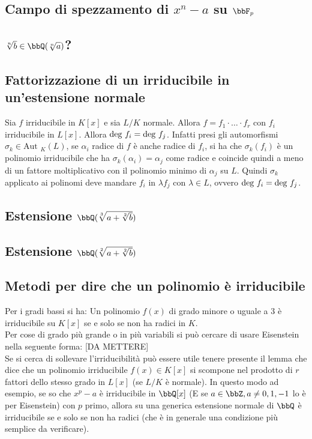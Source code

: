 \documentclass[a4paper,NoNotes,GeneralMath]{stdmdoc}
\newcommand{\Aut}{\text{Aut }}
\begin{document}
	\subsection{Campo di spezzamento di $x^n - a$ su $\bbF_p$}
	
	\subsection{$\sqrt[n]{b} \in \bbQ(\sqrt[n]{a})$?}
	
	\subsection{Fattorizzazione di un irriducibile in un'estensione normale}
	Sia $f$ irriducibile in $K[x]$ e sia $L/K$ normale. Allora $f = f_1 \cdot \ldots \cdot f_r$ con $f_i$ irriducibile in $L[x]$. Allora $\mbox{deg } f_i = \mbox{deg } f_j$. Infatti presi gli automorfismi $\sigma_k \in \Aut_K(L)$, se $\alpha_i$ radice di $f$ è anche radice di $f_i$, si ha che $\sigma_k(f_i)$ è un polinomio irriducibile che ha $\sigma_k(\alpha_i) = \alpha_j$ come radice e coincide quindi a meno di un fattore moltiplicativo con il polinomio minimo di $\alpha_j$ su $L$. Quindi $\sigma_k$ applicato ai polinomi deve mandare $f_i$ in $\lambda f_j$ con $\lambda \in L$, ovvero $\mbox{deg } f_i = \mbox{deg } f_j$.
	
	\subsection{Estensione $\bbQ(\sqrt[3]{a + \sqrt[2]{b}})$}
	
	\subsection{Estensione $\bbQ(\sqrt[2]{a + \sqrt[2]{b}})$}
	
	\subsection{Metodi per dire che un polinomio è irriducibile}
	Per i gradi bassi si ha: Un polinomio $f(x)$ di grado minore o uguale a $3$ è irriducibile su $K[x]$ se e solo se non ha radici in $K$. \\
	Per cose di grado più grande o in più variabili si può cercare di usare Eisenstein nella seguente forma: [DA METTERE] \\
	Se si cerca di sollevare l'irriducibilità può essere utile tenere presente il lemma che dice che un polinomio irriducibile $f(x) \in K[x]$ si scompone nel prodotto di $r$ fattori dello stesso grado in $L[x]$ (se $L/K$ è normale). In questo modo ad esempio, se so che $x^p - a$ è irriducibile in $\bbQ[x]$ (E se $a \in \bbZ, a \neq 0,1,-1$ lo è per Eisenstein) con $p$ primo, allora su una generica estensione normale di $\bbQ$ è irriducibile se e solo se non ha radici (che è in generale una condizione più semplice da verificare).
	
\end{document}
